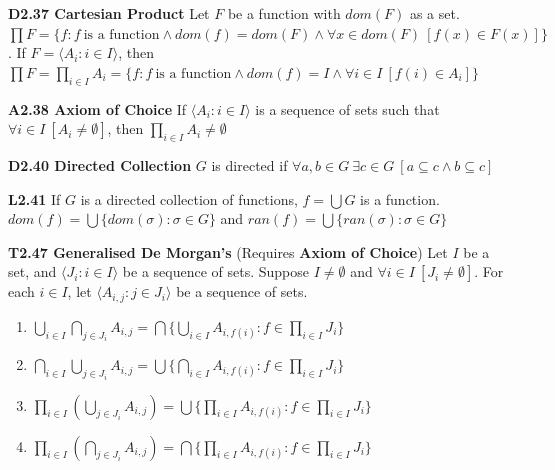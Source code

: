\documentclass[10pt, landscape]{article}
\begin{document}
\begin{multicols*}{3}
\textbf{D2.37 Cartesian Product} Let $F$ be a function with $dom(F)$ as a set. $\prod F=\{f:f \ \text{is a function} \land dom(f) = dom(F) \land \forall x \in dom(F) \ [f(x) \in F(x)]\}$. If $F=\langle A_i : i \in I \rangle$, then $\prod F = \prod_{i \in I}A_i = \{f: f \ \text{is a function} \land dom(f)=I \land \forall i \in I\ [f(i) \in A_i]\}$

\textbf{A2.38 Axiom of Choice} If $\langle A_i : i \in I \rangle$ is a sequence of sets such that $\forall i \in I \ [A_i \neq \emptyset]$, then $\prod_{i \in I} A_i \neq \emptyset$

\textbf{D2.40 Directed Collection} $G$ is directed if $\forall a, b \in G \ \exists c \in G \ [a\subseteq c \land b \subseteq c]$

\textbf{L2.41} If $G$ is a directed collection of functions, $f=\bigcup G$ is a function. $dom(f)=\bigcup\{dom(\sigma):\sigma \in G\}$ and $ran(f)=\bigcup\{ran(\sigma) : \sigma \in G\}$

\textbf{T2.47 Generalised De Morgan's} (Requires \textbf{Axiom of Choice}) Let $I$ be a set, and $\langle J_i: i \in I \rangle$ be a sequence of sets. Suppose $I \neq \emptyset$ and $\forall i \in I \ [J_i \neq \emptyset]$. For each $i \in I$, let $\langle A_{i, j} : j \in J_i \rangle$ be a sequence of sets.
\begin{enumerate}
    \item $\bigcup_{i \in I} \bigcap_{j \in J_i}A_{i,j}=\bigcap\{\bigcup_{i\in I}A_{i,f(i)}:f\in \prod_{i \in I}J_i\}$
    \item $\bigcap_{i \in I} \bigcup_{j \in J_i}A_{i,j}=\bigcup\{\bigcap_{i\in I}A_{i,f(i)}:f\in \prod_{i \in I}J_i\}$
    \item $\prod_{i \in I}(\bigcup_{j\in J_i}A_{i,j})=\bigcup\{\prod_{i \in I}A_{i, f(i)}:f\in\prod_{i\in I} J_i\}$
    \item $\prod_{i \in I}(\bigcap_{j\in J_i}A_{i,j})=\bigcap\{\prod_{i \in I}A_{i, f(i)}:f\in\prod_{i\in I} J_i\}$
\end{enumerate}


\end{multicols*}
\end{document}
